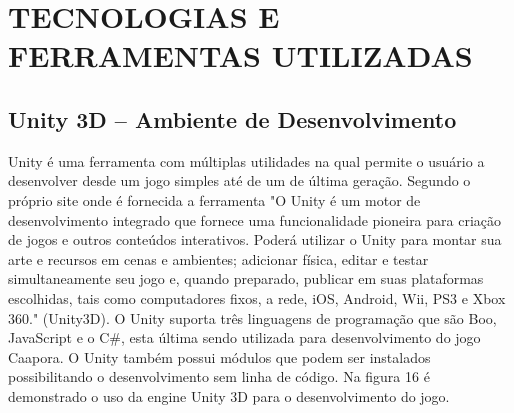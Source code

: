 \chapter{TECNOLOGIAS E FERRAMENTAS UTILIZADAS}
\label{cap:TECNOLOGIAS-E-FERRAMENTAS-UTILIZADAS}


\section{Unity 3D – Ambiente de Desenvolvimento}
\label{sec:Unity-3D-–-Ambiente-de-Desenvolvimento}

Unity é uma ferramenta com múltiplas utilidades na qual permite o usuário a desenvolver desde um jogo simples até de um de última geração.
Segundo o próprio site onde é fornecida a ferramenta "O Unity é um motor de desenvolvimento integrado que fornece uma funcionalidade pioneira para criação de jogos e outros conteúdos interativos. Poderá utilizar o Unity para montar sua arte e recursos em cenas e ambientes; adicionar física, editar e testar simultaneamente seu jogo e, quando preparado, publicar em suas plataformas escolhidas, tais como computadores fixos, a rede, iOS, Android, Wii, PS3 e Xbox 360." (Unity3D).
O Unity suporta três linguagens de programação que são Boo, JavaScript e o C\#, esta última sendo utilizada para desenvolvimento do jogo Caapora. O Unity também possui módulos que podem ser instalados possibilitando o desenvolvimento sem linha de código. Na figura 16 é demonstrado o uso da engine Unity 3D para o desenvolvimento do jogo.


	\begin{figure}[h!]
		\centering
	\end{figure}
	
